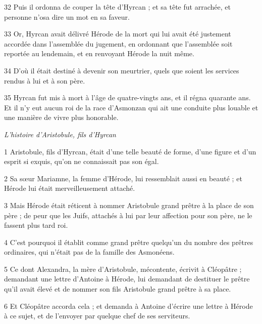 \par 32 Puis il ordonna de couper la tête d'Hyrcan ; et sa tête fut arrachée, et personne n'osa dire un mot en sa faveur.

\par 33 Or, Hyrcan avait délivré Hérode de la mort qui lui avait été justement accordée dans l'assemblée du jugement, en ordonnant que l'assemblée soit reportée au lendemain, et en renvoyant Hérode la nuit même.

\par 34 D'où il était destiné à devenir son meurtrier, quels que soient les services rendus à lui et à son père.

\par 35 Hyrcan fut mis à mort à l'âge de quatre-vingts ans, et il régna quarante ans. Et il n'y eut aucun roi de la race d'Asmonzan qui ait une conduite plus louable et une manière de vivre plus honorable.


\par \textit{L'histoire d'Aristobule, fils d'Hyrcan}

\par 1 Aristobule, fils d'Hyrcan, était d'une telle beauté de forme, d'une figure et d'un esprit si exquis, qu'on ne connaissait pas son égal.

\par 2 Sa sœur Mariamne, la femme d'Hérode, lui ressemblait aussi en beauté ; et Hérode lui était merveilleusement attaché.

\par 3 Mais Hérode était réticent à nommer Aristobule grand prêtre à la place de son père ; de peur que les Juifs, attachés à lui par leur affection pour son père, ne le fassent plus tard roi.

\par 4 C'est pourquoi il établit comme grand prêtre quelqu'un du nombre des prêtres ordinaires, qui n'était pas de la famille des Asmonéens.

\par 5 Ce dont Alexandra, la mère d'Aristobule, mécontente, écrivit à Cléopâtre ; demandant une lettre d'Antoine à Hérode, lui demandant de destituer le prêtre qu'il avait élevé et de nommer son fils Aristobule grand prêtre à sa place.

\par 6 Et Cléopâtre accorda cela ; et demanda à Antoine d'écrire une lettre à Hérode à ce sujet, et de l'envoyer par quelque chef de ses serviteurs.

